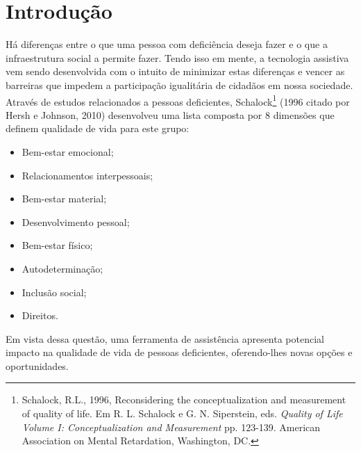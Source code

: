\chapter{\label{chap:intro}Introdução}


Há diferenças entre o que uma pessoa com deficiência deseja fazer e o que a infraestrutura social a permite fazer. Tendo isso em mente, a tecnologia assistiva vem sendo desenvolvida com o intuito de minimizar estas diferenças e vencer as barreiras que impedem a participação igualitária de cidadãos em nossa sociedade. Através de estudos relacionados a pessoas deficientes, Schalock\footnote{Schalock, R.L., 1996, Reconsidering the conceptualization and measurement of quality of life. Em R. L. Schalock e G. N. Siperstein, eds. \emph{Quality of Life Volume I: Conceptualization and Measurement} pp. 123-139. American Association on Mental Retardation, Washington, DC.} (1996 citado por Hersh e Johnson, 2010)\nocite{HERSH2010ASSISTIVE} desenvolveu uma lista composta por 8 dimensões que definem qualidade de vida para este grupo:
\begin{itemize}
    \item Bem-estar emocional;
    \item Relacionamentos interpessoais;
    \item Bem-estar material;
    \item Desenvolvimento pessoal;
    \item Bem-estar físico;
    \item Autodeterminação;
    \item Inclusão social;
    \item Direitos.
\end{itemize}
Em vista dessa questão, uma ferramenta de assistência apresenta potencial impacto na qualidade de vida de pessoas deficientes, oferendo-lhes novas opções e oportunidades.

